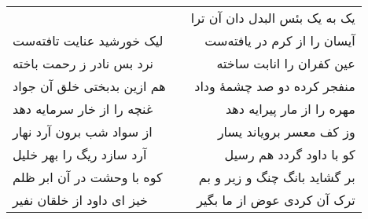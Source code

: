 \begin{center}
\begin{longtable}{l p{0.5cm} r}
&&
یک به یک بئس البدل دان آن ترا
\\
لیک خورشید عنایت تافته‌ست
&&
آیسان را از کرم در یافته‌ست
\\
نرد بس نادر ز رحمت باخته
&&
عین کفران را انابت ساخته
\\
هم ازین بدبختی خلق آن جواد
&&
منفجر کرده دو صد چشمهٔ وداد
\\
غنچه را از خار سرمایه دهد
&&
مهره را از مار پیرایه دهد
\\
از سواد شب برون آرد نهار
&&
وز کف معسر برویاند یسار
\\
آرد سازد ریگ را بهر خلیل
&&
کو با داود گردد هم رسیل
\\
کوه با وحشت در آن ابر ظلم
&&
بر گشاید بانگ چنگ و زیر و بم
\\
خیز ای داود از خلقان نفیر
&&
ترک آن کردی عوض از ما بگیر
\\
\end{longtable}
\end{center}
